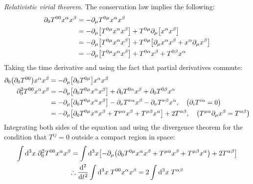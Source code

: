 \documentclass{report}
\begin{document}
\begin{subquests}
	\item \emph{Relativistic virial theorem.}
	The conservation law implies the following:
	\begin{align*}
		\partial_0 T^{00}x^{\alpha}x^{\beta} & = -\partial_{\mu}T^{0\mu}x^{\alpha}x^{\beta} \\
		& = -\partial_{\mu}\bqty{T^{0\mu}x^{\alpha}x^{\beta}} + T^{0\mu}\partial_{\mu}\bqty{x^{\alpha}x^{\beta}} \\
		& = -\partial_{\mu}\bqty{T^{0\mu}x^{\alpha}x^{\beta}} + T^{0\mu}\bqty{\partial_{\mu}x^{\alpha}x^{\beta} + x^{\alpha}\partial_{\mu}x^{\beta}} \\
		& =  -\partial_{\mu}\bqty{T^{0\mu}x^{\alpha}x^{\beta}} + T^{0\alpha}x^{\beta} + T^{0\beta}x^{\alpha}
	\end{align*}
	Taking the time derivative and using the fact that partial derivatives commute:
	\begin{align*}
		\partial_0\pqty{\partial_0 T^{00}}x^{\alpha}x^{\beta} & = -\partial_{\mu}\bqty{\partial_0 T^{0\mu}}x^{\alpha}x^{\beta} \\
		\partial^2_0 T^{00}x^{\alpha}x^{\beta} & = -\partial_{\mu}\bqty{\partial_0 T^{0\mu}x^{\alpha}x^{\beta}} + \partial_0 T^{0\alpha}x^{\beta} + \partial_0 T^{0\beta}x^{\alpha} \\
		& = -\partial_{\mu}\bqty{\partial_0 T^{0\mu}x^{\alpha}x^{\beta}} - \partial_{\nu}T^{\nu\alpha}x^{\beta} - \partial_{\nu}T^{\nu\beta}x^{\alpha}, \quad \pqty{\partial_i T^{i\alpha} = 0} \\
		& = -\partial_{\mu}\bqty{\partial_0 T^{0\mu}x^{\alpha}x^{\beta} + T^{\mu\alpha}x^{\beta} + T^{\mu\beta}x^{\alpha}} + 2 T^{\alpha\beta}, \quad \pqty{T^{\mu\alpha}\partial_{\mu}x^{\beta} = T^{\alpha\beta}}
	\end{align*}
	Integrating both sides of the equation and using the divergence theorem for the condition that $T^{ij} = 0$ outside a compact region in space:
	\begin{gather*}
		\int \dd^3{x}\;\partial^2_0 T^{00} x^{\alpha}x^{\beta} = \int \dd^3{x} \bqty{-\partial_{\mu}\pqty{\partial_0 T^{0\mu}x^{\alpha}x^{\beta} + T^{\mu\alpha}x^{\beta} + T^{\mu\beta}x^{\alpha}} + 2 T^{\alpha\beta}} \\
		\therefore \dv[2]{t}\int \dd^3{x}\;T^{00} x^{\alpha} x^{\beta} = 2 \int \dd^3{x}\; T^{\alpha\beta}
	\end{gather*}


\end{subquests}
\end{document}
